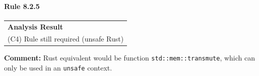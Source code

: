 \paragraph{Rule 8.2.5}
\begin{longtable}{p{13cm}}
\textbf{Analysis Result} \\
(C4) Rule still required (unsafe Rust) \\
\end{longtable}
\textbf{Comment:} Rust equivalent would be function \texttt{std::mem::transmute}, which can only be used in an \texttt{unsafe} context. \\
